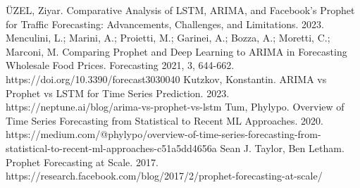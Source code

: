 \documentclass[french]{article}
\begin{document}
    \newpage
    \begin{thebibliography}{5}
         ÜZEL, Ziyar. Comparative Analysis of LSTM, ARIMA, and Facebook’s Prophet for Traffic Forecasting: Advancements, Challenges, and Limitations. 2023. 
         Menculini, L.; Marini, A.; Proietti, M.; Garinei, A.; Bozza, A.; Moretti, C.; Marconi, M. Comparing Prophet and Deep Learning to ARIMA in Forecasting Wholesale Food Prices. Forecasting 2021, 3, 644-662. https://doi.org/10.3390/forecast3030040
         Kutzkov, Konstantin. ARIMA vs Prophet vs LSTM for Time Series Prediction. 2023. https://neptune.ai/blog/arima-vs-prophet-vs-lstm
         Tum, Phylypo. Overview of Time Series Forecasting from Statistical to Recent ML Approaches. 2020. https://medium.com/@phylypo/overview-of-time-series-forecasting-from-statistical-to-recent-ml-approaches-c51a5dd4656a
         Sean J. Taylor, Ben Letham. Prophet Forecasting at Scale. 2017. https://research.facebook.com/blog/2017/2/prophet-forecasting-at-scale/
    \end{thebibliography}

    
\end{document}
